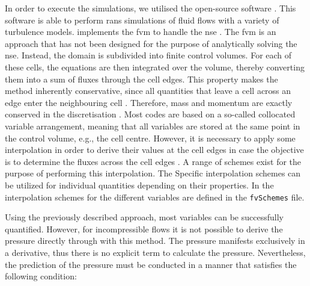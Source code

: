 In order to execute the simulations, we utilised the open-source software . 
This software is able to perform \acrshort{rans} simulations of fluid flows with a variety of turbulence models. 
 implements the \acrfull{fvm} to handle  the \acrshort{nse} \citep{weller_tensorial_1998}.
The \acrshort{fvm} is an approach that has not been designed for the purpose of  analytically solving the \acrshort{nse}.  
Instead, the domain is subdivided into finite control volumes.
For each of these cells, the equations are then integrated over the volume, thereby converting them into a sum of fluxes through the cell edges.
This property makes the method inherently conservative, since all quantities  that leave a cell across an edge enter the neighbouring cell \citep{moukalled_finite_2016}. 
Therefore, mass and momentum are exactly conserved in the discretisation \citep{weller_tensorial_1998}.
Most codes are based on a so-called collocated variable arrangement, meaning that all variables are stored at the same point in the control volume, e.g., the cell centre.
However,  it is necessary to apply some interpolation in order to derive their values at the cell edges in case the objective is  to determine the fluxes across the cell edges \citep{schlatter_lecture_2025}.
A range of schemes exist for the purpose of performing this interpolation. The 
Specific interpolation schemes can be utilized for individual  quantities depending on their properties.
In  the interpolation schemes for the different variables are defined in the \texttt{fvSchemes} file.


Using the previously described approach, most variables can be successfully quantified.
However, for incompressible flows it is not possible to derive the pressure  directly through with this method.
The pressure manifests exclusively in a derivative, thus there is no explicit term to calculate the pressure.
Nevertheless, the prediction of the pressure  must be conducted in a manner that satisfies  the following condition:

